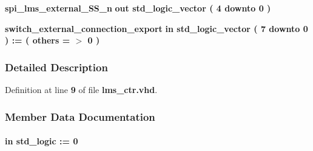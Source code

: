\begin{DoxyCompactItemize}
{\bf spi\+\_\+lms\+\_\+external\+\_\+\+S\+S\+\_\+n}  {\bfseries {\bfseries \textcolor{keywordflow}{out}\textcolor{vhdlchar}{ }}} {\bfseries \textcolor{comment}{std\+\_\+logic\+\_\+vector}\textcolor{vhdlchar}{ }\textcolor{vhdlchar}{(}\textcolor{vhdlchar}{ }\textcolor{vhdlchar}{ } \textcolor{vhdldigit}{4} \textcolor{vhdlchar}{ }\textcolor{keywordflow}{downto}\textcolor{vhdlchar}{ }\textcolor{vhdlchar}{ } \textcolor{vhdldigit}{0} \textcolor{vhdlchar}{ }\textcolor{vhdlchar}{)}\textcolor{vhdlchar}{ }} 
\item 
{\bf switch\+\_\+external\+\_\+connection\+\_\+export}  {\bfseries {\bfseries \textcolor{keywordflow}{in}\textcolor{vhdlchar}{ }}} {\bfseries \textcolor{comment}{std\+\_\+logic\+\_\+vector}\textcolor{vhdlchar}{ }\textcolor{vhdlchar}{(}\textcolor{vhdlchar}{ }\textcolor{vhdlchar}{ } \textcolor{vhdldigit}{7} \textcolor{vhdlchar}{ }\textcolor{keywordflow}{downto}\textcolor{vhdlchar}{ }\textcolor{vhdlchar}{ } \textcolor{vhdldigit}{0} \textcolor{vhdlchar}{ }\textcolor{vhdlchar}{)}\textcolor{vhdlchar}{ }\textcolor{vhdlchar}{ }\textcolor{vhdlchar}{ }\textcolor{vhdlchar}{\+:}\textcolor{vhdlchar}{=}\textcolor{vhdlchar}{ }\textcolor{vhdlchar}{(}\textcolor{vhdlchar}{ }\textcolor{vhdlchar}{ }\textcolor{keywordflow}{others}\textcolor{vhdlchar}{ }\textcolor{vhdlchar}{ }\textcolor{vhdlchar}{=}\textcolor{vhdlchar}{ }\textcolor{vhdlchar}{$>$}\textcolor{vhdlchar}{ }\textcolor{vhdlchar}{\textquotesingle{}}\textcolor{vhdlchar}{ } \textcolor{vhdldigit}{0} \textcolor{vhdlchar}{ }\textcolor{vhdlchar}{\textquotesingle{}}\textcolor{vhdlchar}{ }\textcolor{vhdlchar}{)}\textcolor{vhdlchar}{ }} 
\end{DoxyCompactItemize}


\subsubsection{Detailed Description}


Definition at line {\bf 9} of file {\bf lms\+\_\+ctr.\+vhd}.



\subsubsection{Member Data Documentation}
\paragraph[{clk\+\_\+clk}]{ {\bfseries \textcolor{keywordflow}{in}\textcolor{vhdlchar}{ }} {\bfseries \textcolor{comment}{std\+\_\+logic}\textcolor{vhdlchar}{ }\textcolor{vhdlchar}{ }\textcolor{vhdlchar}{\+:}\textcolor{vhdlchar}{=}\textcolor{vhdlchar}{ }\textcolor{vhdlchar}{ }\textcolor{vhdlchar}{\textquotesingle{}}\textcolor{vhdlchar}{ } \textcolor{vhdldigit}{0} \textcolor{vhdlchar}{ }\textcolor{vhdlchar}{\textquotesingle{}}\textcolor{vhdlchar}{ }} \hspace{0.3cm}{\ttfamily [Port]}}\label{classlms__ctr_a2acdf5bcb868b33f5c0ed8fe70b0f946}


